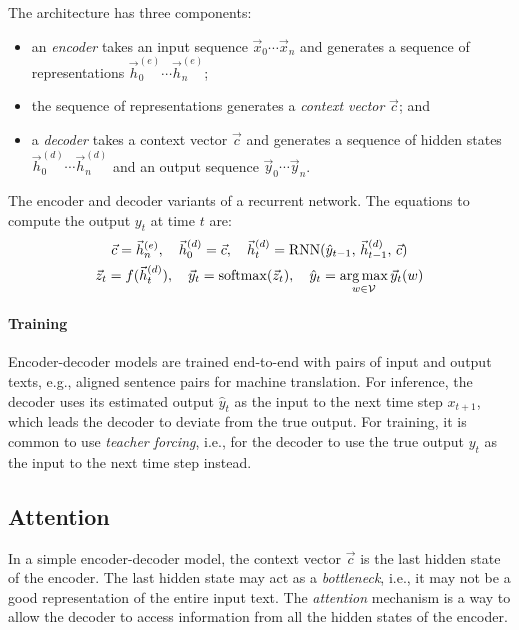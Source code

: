 The architecture has three components:
\begin{itemize}
  \item an \textit{encoder} takes an input sequence $\vec{x}_0 \cdots \vec{x}_n$
        and generates a sequence of representations
        $\vec{h}^{(e)}_0 \cdots \vec{h}^{(e)}_n$;
  \item the sequence of representations generates a \textit{context vector}
        $\vec{c}$; and
  \item a \textit{decoder} takes a context vector $\vec{c}$ and generates a
        sequence of hidden states $\vec{h}^{(d)}_0 \cdots \vec{h}^{(d)}_n$ and
        an output sequence $\vec{y}_0 \cdots \vec{y}_n$.
\end{itemize}
The encoder and decoder variants of a recurrent network.
The equations to compute the output $y_t$ at time $t$ are:
\begin{multline}
  \vec{c}
  = \vec{h}^{(e)}_n
  ,\quad
  \vec{h}^{(d)}_{0}
  = \vec{c}
  ,\quad
  \vec{h}^{(d)}_t
  = \text{RNN}(\hat{y}_{t - 1},\, \vec{h}^{(d)}_{t - 1},\, \vec{c})
  \\
  \vec{z}_t
  = f(\vec{h}^{(d)}_t)
  ,\quad
  \vec{y}_t
  = \operatorname{softmax}(\vec{z}_t)
  ,\quad
  \hat{y}_t
  = \operatorname*{arg\,max}_{w \in \mathcal{V}} \vec{y}_t(w)
\end{multline}

\paragraph{Training}

Encoder-decoder models are trained end-to-end with pairs of input and output
texts, e.g., aligned sentence pairs for machine translation.
For inference, the decoder uses its estimated output $\hat{y}_t$ as the input to
the next time step $x_{t + 1}$, which leads the decoder to deviate from the true
output.
For training, it is common to use \textit{teacher forcing}, i.e., for the
decoder to use the true output $y_t$ as the input to the next time step instead.

\subsection{Attention}

In a simple encoder-decoder model, the context vector $\vec{c}$ is the last
hidden state of the encoder.
The last hidden state may act as a \textit{bottleneck}, i.e., it may not be a
good representation of the entire input text.
The \textit{attention} mechanism is a way to allow the decoder to access
information from all the hidden states of the encoder.

